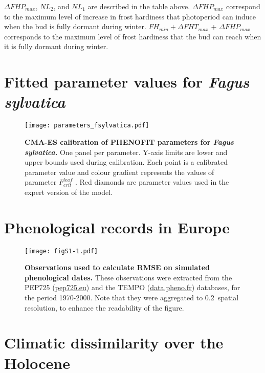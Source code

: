 \documentclass[preprint,12pt,authoryear]{elsarticle}
\begin{document}
\noindent $\Delta FHP_{max}$, $NL_2$, and $NL_1$ are described in the table above. $\Delta FHP_{max}$ correspond to the maximum level of increase in frost hardiness that photoperiod can induce when the bud is fully dormant during winter. $FH_{min} + \Delta FHT_{max}$ + $\Delta FHP_{max}$ corresponds to the maximum level of frost hardiness that the bud can reach when it is fully dormant during winter. 

\newpage

\section{Fitted parameter values for \emph{Fagus sylvatica}}

\begin{figure}[hp]
\vspace*{-0.5cm}
\hspace*{-0.5cm}
\centerline{\texttt{[image: parameters\_fsylvatica.pdf]}}
\caption{\textbf{CMA-ES calibration of PHENOFIT parameters for \emph{Fagus sylvatica}.} One panel per parameter. Y-axis limits are lower and upper bounds used during calibration. Each point is a calibrated parameter value and colour gradient represents the values of parameter $F_{crit}^{leaf}$ . Red diamonds are parameter values used in the expert version of the model.}
\vspace*{-10cm}
\end{figure}


\newpage

\section{Phenological records in Europe}

\begin{figure}[hp]
\centering
\centerline{\texttt{[image: figS1-1.pdf]}}
\caption{\textbf{Observations used to calculate RMSE on simulated phenological dates.} These observations were extracted from the PEP725 (\url{pep725.eu}) and the TEMPO (\url{data.pheno.fr}) databases, for the period 1970-2000. Note that they were aggregated to 0.2\degree~spatial resolution, to enhance the readability of the figure.}
\vspace*{-10cm}
\end{figure}
\restoregeometry

\clearpage

\section{Climatic dissimilarity over the Holocene}
\end{document}
